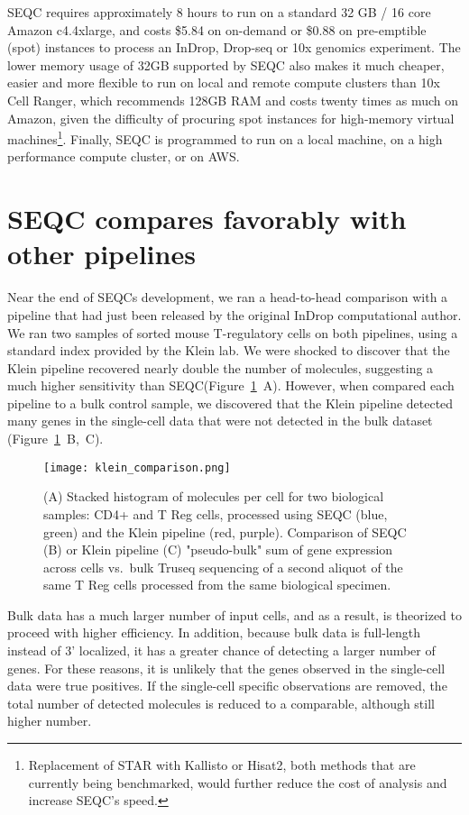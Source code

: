 SEQC requires approximately 8 hours to run on a standard 32 GB / 16 core Amazon c4.4xlarge, and costs \$5.84 on on-demand or \$0.88 on pre-emptible (spot) instances to process an InDrop, Drop-seq or 10x genomics experiment.
The lower memory usage of 32GB supported by SEQC also makes it much cheaper, easier and more flexible to run on local and remote compute clusters than 10x Cell Ranger, which recommends 128GB RAM and costs twenty times as much on Amazon, given the difficulty of procuring spot instances for high-memory virtual machines\footnote{Replacement of STAR with Kallisto or Hisat2, both methods that are currently being benchmarked, would further reduce the cost of analysis and increase SEQC's speed.}. 
Finally, SEQC is programmed to run on a local machine, on a high performance compute cluster, or on AWS. 

\section{SEQC compares favorably with other pipelines}

Near the end of SEQCs development, we ran a head-to-head comparison with a pipeline that had just been released by the original InDrop computational author. 
We ran two samples of sorted mouse T-regulatory cells on both pipelines, using a standard index provided by the Klein lab. 
We were shocked to discover that the Klein pipeline recovered nearly double the number of molecules, suggesting a much higher sensitivity than SEQC\@ (Figure~\ref{fig:klein}~A).
However, when compared each pipeline to a bulk control sample, we discovered that the Klein pipeline detected many genes in the single-cell data that were not detected in the bulk dataset (Figure~\ref{fig:klein}~B,~C). 

\begin{figure}
\centering
\texttt{[image: klein\_comparison.png]}
\caption{(A) Stacked histogram of molecules per cell for two biological samples: CD4+ and T Reg cells, processed using SEQC (blue, green) and the Klein pipeline (red, purple).
Comparison of SEQC (B) or Klein pipeline (C) "pseudo-bulk" sum of gene expression across cells vs.\ bulk Truseq sequencing of a second aliquot of the same T Reg cells processed from the same biological specimen.}
\label{fig:klein}
\end{figure}

Bulk data has a much larger number of input cells, and as a result, is theorized to proceed with higher efficiency. 
In addition, because bulk data is full-length instead of 3' localized, it has a greater chance of detecting a larger number of genes. 
For these reasons, it is unlikely that the genes observed in the single-cell data were true positives.
If the single-cell specific observations are removed, the total number of detected molecules is reduced to a comparable, although still higher number. 

